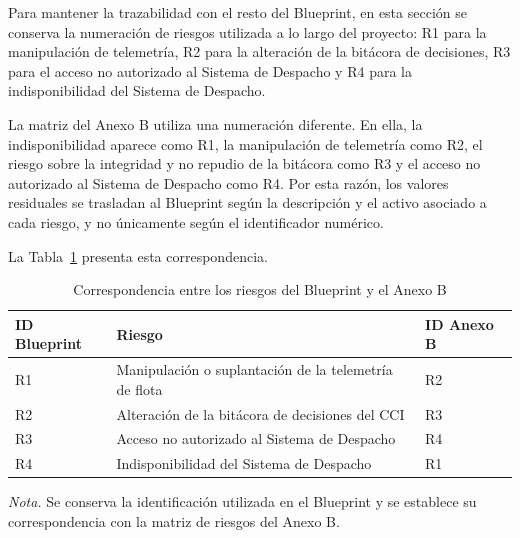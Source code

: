 Para mantener la trazabilidad con el resto del Blueprint, en esta sección se conserva la
numeración de riesgos utilizada a lo largo del proyecto: R1 para la manipulación de telemetría,
R2 para la alteración de la bitácora de decisiones, R3 para el acceso no autorizado al Sistema
de Despacho y R4 para la indisponibilidad del Sistema de Despacho.

La matriz del Anexo B utiliza una numeración diferente. En ella, la
indisponibilidad aparece como R1, la manipulación de telemetría como R2, el riesgo sobre la
integridad y no repudio de la bitácora como R3 y el acceso no autorizado al Sistema de
Despacho como R4. Por esta razón, los valores residuales se trasladan al Blueprint según la
descripción y el activo asociado a cada riesgo, y no únicamente según el identificador numérico.

La Tabla~\ref{tab:correspondencia_riesgos} presenta esta correspondencia.

\begin{table}[H]
	\centering
	\caption{Correspondencia entre los riesgos del Blueprint y el Anexo B}
	\label{tab:correspondencia_riesgos}
	\small
	\setlength{\tabcolsep}{5pt}
	\renewcommand{\arraystretch}{1.15}
	
	\begin{tabularx}{\textwidth}{
			>{\centering\arraybackslash}p{1.6cm}
			>{\raggedright\arraybackslash}X
			>{\centering\arraybackslash}p{2.0cm}}
		
		\toprule
		\textbf{ID Blueprint} &
		\textbf{Riesgo} &
		\textbf{ID Anexo B} \\
		\midrule
		
		R1 &
		Manipulación o suplantación de la telemetría de flota &
		R2 \\
		
		R2 &
		Alteración de la bitácora de decisiones del CCI &
		R3 \\
		
		R3 &
		Acceso no autorizado al Sistema de Despacho &
		R4 \\
		
		R4 &
		Indisponibilidad del Sistema de Despacho &
		R1 \\
		
		\bottomrule
	\end{tabularx}
	
	\begin{minipage}{0.96\textwidth}
		\footnotesize
		\textit{Nota.} Se conserva la identificación utilizada en el Blueprint y se establece su
		correspondencia con la matriz de riesgos del Anexo B.
	\end{minipage}
\end{table}


